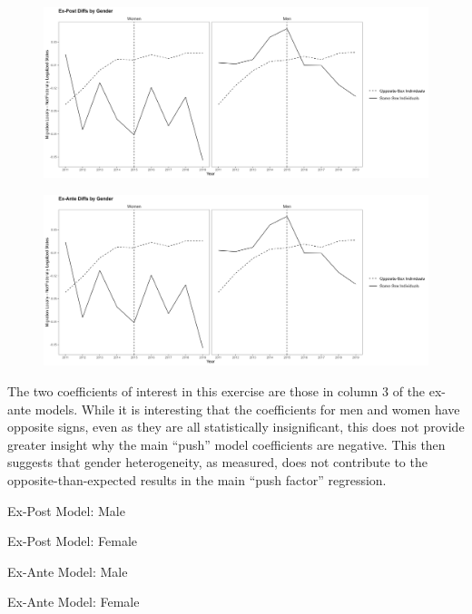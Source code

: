 \documentclass[12pt,letterpaper]{article}
\begin{document}
\begin{figure}[p]
    \centering
    \includegraphics[width=1\linewidth]{outputs/summary_stats/sex_post_diffs.png}
    \caption{}
    \label{fig: sex_post_diffs}
\end{figure}
\begin{figure}[p]
    \centering
    \includegraphics[width=1\linewidth]{outputs/summary_stats/sex_ante_diffs.png}
    \caption{}
    \label{fig: sex_ante_diffs}
\end{figure}

The two coefficients of interest in this exercise are those in column 3 of the ex-ante models. While it is interesting that the coefficients for men and women have opposite signs, even as they are all statistically insignificant, this does not provide greater insight why the main “push” model coefficients are negative. This then suggests that gender heterogeneity, as measured, does not contribute to the opposite-than-expected results in the main “push factor” regression.

\clearpage %
\begin{table}[p] %
    \centering
    \caption{Ex-Post Model: Male}
    \label{tab: male_expost_model}
    
\end{table}
\begin{table}[p]
    \centering
    \caption{Ex-Post Model: Female}
    \label{tab: female_expost_model}
    
\end{table}
\begin{table}[p] %
    \centering
    \caption{Ex-Ante Model: Male}
    \label{tab: male_exante_model}
    
\end{table}
\begin{table}[p] %
    \centering
    \caption{Ex-Ante Model: Female}
    \label{tab: female_exante_model}
    
\end{table}
\end{document}

